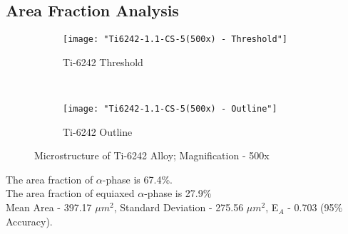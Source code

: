 \subsection{Area Fraction Analysis}


\begin{figure}[H]
    \centering
    \begin{subfigure}{0.49\textwidth}
        \texttt{[image: "Ti6242-1.1-CS-5(500x) - Threshold"]}
        \caption{Ti-6242 Threshold}
        \label{fig:Ti-6242 Threshold}
    \end{subfigure}
    ~
    \begin{subfigure}{0.49\textwidth}
        \texttt{[image: "Ti6242-1.1-CS-5(500x) - Outline"]}
        \caption{Ti-6242 Outline}
        \label{fig:Ti-6242 Outline}
    \end{subfigure}
  
    \caption{Microstructure of Ti-6242 Alloy; Magnification - 500x}
    \label{fig:As-Received}
\end{figure}


The area fraction of $\alpha$-phase is 67.4\%. \\
The area fraction of equiaxed $\alpha$-phase is 27.9\% \\
Mean Area - 397.17 $\mu m^{2}$, Standard Deviation - 275.56 $\mu m^{2}$, E$_{A}$ - 0.703 (95\% Accuracy).